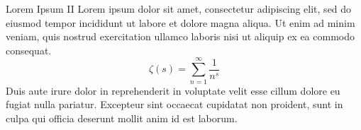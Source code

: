 \begin{titledbox}{Lorem Ipsum II}
    Lorem ipsum dolor sit amet, consectetur adipiscing elit, sed do eiusmod
    tempor incididunt ut labore et dolore magna aliqua. Ut enim ad minim veniam,
    quis nostrud exercitation ullamco laboris nisi ut aliquip ex ea commodo
    consequat.
    \begin{equation}
        \zeta (s) = \sum_{n=1}^\infty \frac{1}{n^s}
    \end{equation}
    Duis aute irure dolor in reprehenderit in voluptate velit esse
    cillum dolore eu fugiat nulla pariatur. Excepteur sint occaecat cupidatat
    non proident, sunt in culpa qui officia deserunt mollit anim id est laborum.
\end{titledbox}